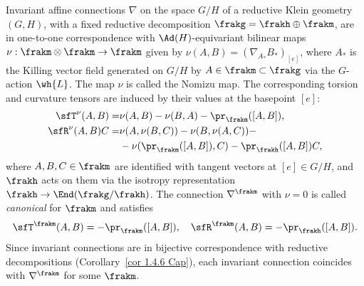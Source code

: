 \begin{cor}[Wang]
    Invariant affine connections $\nabla$ on the space $G\slash H$ of a reductive Klein geometry $(G,H)$, with a fixed reductive decomposition $\frakg=\frakh\oplus\frakm$, are in one-to-one correspondence with $\Ad(H)$-equivariant bilinear maps $\nu:\frakm\otimes\frakm\to \frakm$ given by $\nu(A,B)=(\nabla_{A_\ast}B_\ast)_{[e]}$, where $A_\ast$ is the Killing vector field generated on $G\slash H$ by $A\in\frakm\subset\frakg$ via the $G$-action $\wh{L}$. The map $\nu$ is called the Nomizu map. The corresponding torsion and curvature tensors are induced by their values at the basepoint $[e]$:
    \begin{align}
        \sfT^\nu(A,B)=&\nu(A,B)-\nu(B,A)-\pr_{\frakm}([A,B]),\\
        \sfR^\nu(A,B)C=&\nu(A,\nu(B,C))-\nu(B,\nu(A,C))-\\
        &-\nu(\pr_\frakm([A,B]),C)-\pr_\frakh([A,B])C,\label{eq nomizu curvature}
    \end{align}
    where $A,B,C\in\frakm$ are identified with tangent vectors at $[e]\in G\slash H$, and $\frakh$ acts on them via the isotropy representation $\frakh\to\End(\frakg\slash\frakh)$. The connection $\nabla^\frakm$ with $\nu=0$ is called \emph{canonical} for $\frakm$ and satisfies 
    \[\sfT^\frakm(A,B)=-\pr_\frakm([A,B]),\quad \sfR^\frakm(A,B)=-\pr_\frakh([A,B]).\]
    Since invariant connections are in bijective correspondence with reductive decompositions (Corollary~\ref{cor 1.4.6 Cap}), each invariant connection coincides with $\nabla^\frakm$ for some $\frakm$.
\end{cor}


